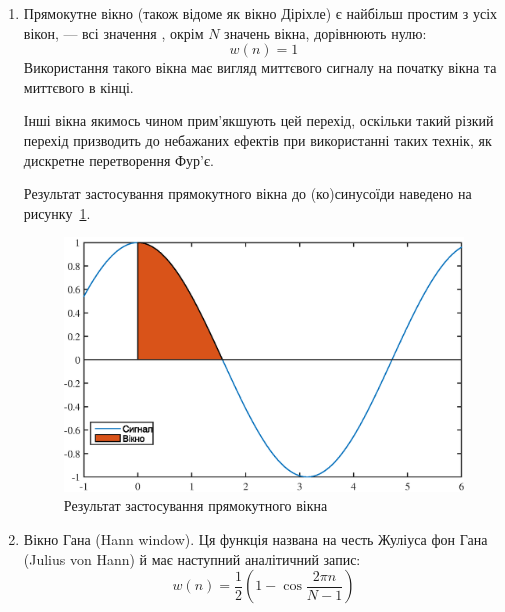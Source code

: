         \begin{enumerate}
            \item Прямокутне вікно (також відоме як вікно Діріхле) є найбільш простим з усіх вікон, --- всі значення ,
                окрім $N$ значень вікна, дорівнюють нулю:
                \begin{equation*}
                    w( n ) = 1
                \end{equation*}
                Використання такого вікна має вигляд миттєвого  сигналу на початку вікна та
                миттєвого  в кінці.

                Інші вікна якимось чином прим’якшують цей перехід, оскільки такий різкий перехід призводить до
                небажаних ефектів при використанні таких технік, як дискретне перетворення Фур’є.

                Результат застосування прямокутного вікна до (ко)синусоїди наведено на рисунку~\ref{fig:rekt-appl}.

                \begin{figure}[h]
                    \centering
                    \includegraphics[width=\textwidth]{rect-applicated.eps}
                    \caption{Результат застосування прямокутного вікна}
                    \label{fig:rekt-appl}
                \end{figure}
            \item Вікно Гана (Hann window).
                Ця функція названа на честь Жуліуса фон Гана (Julius von Hann) й має наступний аналітичний запис:
                \begin{equation}
                    w( n ) = \frac12 \left( 1 - \cos{ \frac{ 2 \pi n}{N - 1}} \right)
                \end{equation}


\end{enumerate}
